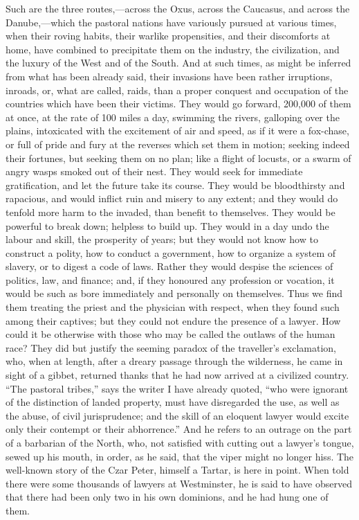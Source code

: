 Such are the three
routes,—across the Oxus, across the Caucasus, and across the
Danube,—which the pastoral nations have variously pursued at
various times, when their roving habits, their warlike propensities,
and their discomforts at home, have combined to precipitate them on
the industry, the civilization, and the luxury of the West and of the
South. And at such times, as might be inferred from what has been
already said, their invasions have been rather irruptions, inroads,
or, what are called, raids, than a proper conquest and occupation of
the countries which have been their victims. They would go forward,
200,000 of them at once, at the rate of 100 miles a day, swimming the
rivers, galloping over the plains, intoxicated with the excitement of
air and speed, as if it were a fox-chase, or full of pride and fury at
the reverses which set them in motion; seeking indeed their fortunes,
but seeking them on no plan; like a flight of locusts, or a swarm of
angry wasps smoked out of their nest. They would seek for immediate
gratification, and let the future take its course. They would be
bloodthirsty and rapacious, and would inflict ruin and misery to any
extent; and they would do tenfold more harm to the invaded, than
benefit to themselves. They would be powerful to break down; helpless
to build up. They would in a day undo the labour and skill, the
prosperity of years; but they would not know how to construct a
polity, how to conduct a government, how to organize a system of
slavery, or to digest a code of laws. Rather they would despise the
sciences of politics, law, and finance; and, if they honoured any
profession or vocation, it would be such as bore immediately and
personally on themselves. Thus we find them treating the priest and
the physician with respect, when they found such among their captives;
but they could not endure the presence of a lawyer. How could it be
otherwise with those who may be called the outlaws of the human
race? They did but justify the seeming paradox of the traveller's
exclamation, who, when at length, after a dreary passage through the
wilderness, he came in sight of a gibbet, returned thanks that he had
now arrived at a civilized country. ``The pastoral tribes,'' says the
writer I have already quoted, ``who were ignorant of the distinction of
landed property, must have disregarded the use, as well as the abuse,
of civil jurisprudence; and the skill of an eloquent lawyer would
excite only their contempt or their abhorrence.'' And he refers to an
outrage on the part of a barbarian of the North, who, not satisfied
with cutting out a lawyer's tongue, sewed up his mouth, in order, as
he said, that the viper might no longer hiss. The well-known story of
the Czar Peter, himself a Tartar, is here in point. When told there
were some thousands of lawyers at Westminster, he is said to have
observed that there had been only two in his own dominions, and he had
hung one of them.

